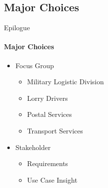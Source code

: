     \subsection{Major Choices}
    \begin{frame}{Epilogue}\framesubtitle{Major Choices}    
        \begin{itemize}
            \item<1-> Focus Group
            \begin{itemize}
                \item<1-> Military Logistic Division
                \item<1-> Lorry Drivers
                \item<1-> Postal Services
                \item<1-> Transport Services
            \end{itemize}
            \item<2-> Stakeholder
            \begin{itemize}
                \item<2-> Requirements
                \item<2-> Use Case Insight
            \end{itemize}
        \end{itemize}
    \end{frame}

